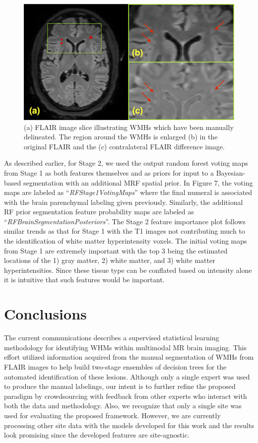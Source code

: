 \documentclass[11pt,]{article}
\begin{document}
\begin{figure}[htbp]
\centering
\includegraphics{Figures/FLAIRcontralaleteralWithLesionsAlternate.png}
\caption{(a) FLAIR image slice illustrating WMHs which have been
manually delineated. The region around the WMHs is enlarged (b) in the
original FLAIR and the (c) contralateral FLAIR difference image.}
\end{figure}

As described earlier, for Stage 2, we used the output random forest
voting maps from Stage 1 as both features themselves and as priors for
input to a Bayesian-based segmentation with an additional MRF spatial
prior. In Figure 7, the voting maps are labeled as
``\emph{RFStage1VotingMaps}'' where the final numeral is associated with
the brain parenchymal labeling given previously. Similarly, the
additional RF prior segmentation feature probability maps are labeled as
``\emph{RFBrainSegmentationPosteriors}''. The Stage 2 feature importance
plot follows similar trends as that for Stage 1 with the T1 images not
contributing much to the identification of white matter hyperintensity
voxels. The initial voting maps from Stage 1 are extremely important
with the top 3 being the estimated locations of the 1) gray matter, 2)
white matter, and 3) white matter hyperintensities. Since these tissue
type can be conflated based on intensity alone it is intuitive that such
features would be important.

\section{Conclusions}\label{conclusions}

The current communications describes a supervised statistical learning
methodology for identifying WHMs within multimodal MR brain imaging.
This effort utilized information acquired from the manual segmentation
of WMHs from FLAIR images to help build two-stage ensembles of decision
trees for the automated identification of these lesions. Although only a
single expert was used to produce the manual labelings, our intent is to
further refine the proposed paradigm by crowdsourcing with feedback from
other experts who interact with both the data and methodology. Also, we
recognize that only a single site was used for evaluating the proposed
framework. However, we are currently processing other site data with the
models developed for this work and the results look promising since the
developed features are site-agnostic.
\end{document}
